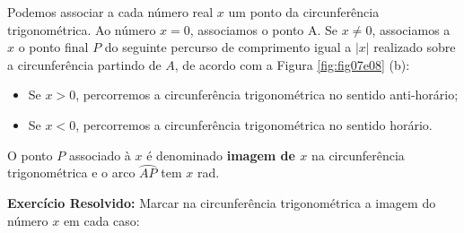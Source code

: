 Podemos associar a cada número real $x$ um ponto da circunferência trigonométrica. Ao número $x=0$, associamos o ponto A. Se $x \neq 0$, associamos a $x$ o ponto final $P$ do seguinte percurso de comprimento igual a $|x|$ realizado sobre a circunferência partindo de $A$, de acordo com a Figura \ref{fig:fig07e08} (b):

\begin{itemize}
    \item 	Se $x>0$, percorremos a circunferência trigonométrica no sentido anti-horário;
    \item 	Se $x<0$, percorremos a circunferência trigonométrica no sentido horário.
\end{itemize}

O ponto $P$ associado à $x$ é denominado \textbf{imagem de $x$} na circunferência trigonométrica e o arco $\wideparen{AP}$ tem $x$ rad.

\noindent
\textbf{Exercício Resolvido:} Marcar na circunferência trigonométrica a imagem do número $x$ em cada caso:

